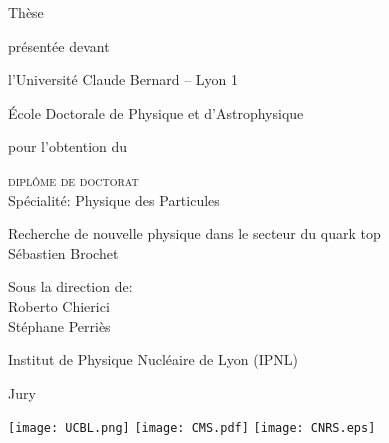 \begin{titlepage}

\begin{center}
{\Large Thèse\\}

\vspace{1em}

{\small présentée devant\\}

\vspace{1em}

{\Large l'Université Claude Bernard -- Lyon 1\\

\vspace{0.2em}

École Doctorale de Physique et d'Astrophysique\\}

\vspace{2.5em}

pour l'obtention du \\

\vspace{2em}

{\Large \textsc{diplôme de doctorat}\\
\small Spécialité: Physique des Particules}

\end{center}

\vspace{3em}

\begin{center} \huge
Recherche de nouvelle physique dans le secteur du quark top\\
\vspace{0.8em}
\Large Sébastien Brochet
\end{center}

\vspace{1.2em}

\begin{center}
\large
Sous la direction de:\\
Roberto Chierici\\
Stéphane Perriès
\end{center}

\begin{center}
\Large Institut de Physique Nucléaire de Lyon (IPNL)
\end{center}

\vspace{2em}

\begin{center}
Jury
\end{center}

\vfill

\begin{center}
\texttt{[image: UCBL.png]} \hspace{1cm}  \hspace{1cm} \texttt{[image: CMS.pdf]} \hspace{1cm} \texttt{[image: CNRS.eps]}
\end{center}

\end{titlepage}
